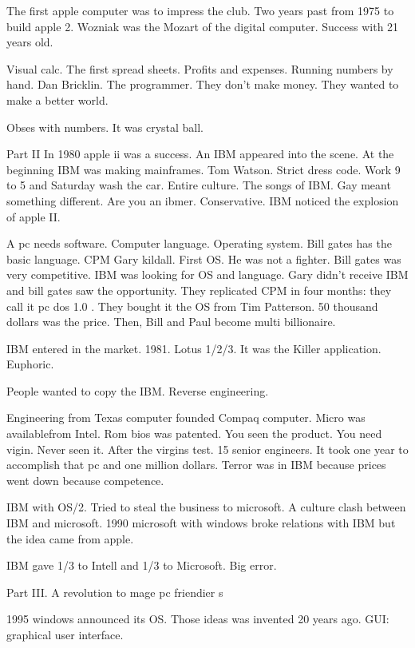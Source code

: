   The first apple computer was to impress the club. 
  Two years past from 1975 to build apple 2. Wozniak was the Mozart of the digital computer. 
  Success with 21 years old. 
  
  Visual calc. The first spread sheets.  Profits and expenses. Running numbers by hand. Dan Bricklin. The programmer. They don't make money. 
  They wanted to make a better world. 
  
  Obses with numbers. It was crystal ball. 
  
  Part II
  In 1980 apple ii was a success. An IBM appeared into the scene. At the beginning IBM was making mainframes. Tom Watson. Strict dress code. 
  Work 9 to 5 and Saturday wash the car. Entire culture. The songs of IBM. Gay meant something different. Are you an ibmer. Conservative. IBM 
  noticed the explosion of apple II. 
  
  A pc needs software. Computer language. Operating system. Bill gates has the basic language. CPM Gary kildall. First OS. He was not a 
  fighter. Bill gates was very competitive. 
  IBM was looking for OS and language. Gary didn't receive IBM and bill gates saw the opportunity. They replicated CPM in four months: they 
  call it pc dos 1.0 . They bought it the OS from Tim Patterson. 50 thousand dollars was the price. Then, Bill and Paul become multi 
  billionaire.
  
  IBM entered in the market. 1981. Lotus 1/2/3.
  It was the Killer application. Euphoric. 
  
  People wanted to copy the IBM. 
  Reverse engineering. 
  
  Engineering from Texas computer founded Compaq computer. Micro was availablefrom Intel. Rom bios was patented. You seen the product. You 
  need vigin. Never seen it. After the virgins test. 15 senior engineers. It took one year to accomplish that pc and one million dollars. 
  Terror was in IBM because prices went down because competence. 
  
  IBM with OS/2. Tried to steal the business to microsoft. A culture clash between IBM and microsoft. 1990 microsoft with windows broke 
  relations with IBM but the idea came from apple. 
  
  IBM gave 1/3 to Intell and 1/3 to Microsoft. Big error. 
  
  Part III.
  A revolution to mage pc friendier s
  
  1995 windows announced its OS. Those ideas was invented 20 years ago.  GUI: graphical user interface. 
  
